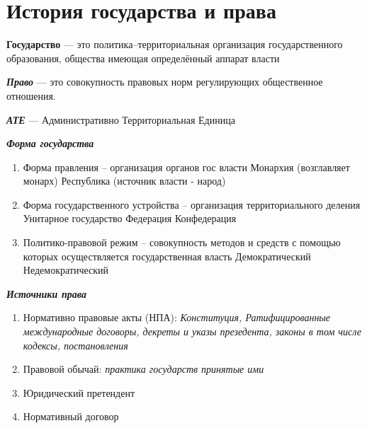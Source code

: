 \documentclass[14pt]{extarticle}
\begin{document}
	\section{История государства и права}
	\textbf{Государство} --- это политика--территориальная организация государственного образования, общества имеющая определённый аппарат власти
	
	\textbf{\textit{Право}} --- это совокупность правовых норм регулирующих общественное отношения.
	
	\textbf{\textit{АТЕ}} --- Административно Территориальная Единица
	
	\begin{center}
		\textbf{\textit{Форма государства}}
	\end{center}
	\begin{enumerate}
		\item Форма правления -- организация органов гос власти
			\subitem Монархия (возглавляет монарх)
			\subitem Республика (источник власти - народ)
		\item Форма государственного устройства -- организация территориального деления
			\subitem Унитарное государство
			\subitem Федерация 
			\subitem Конфедерация
		\item Политико-правовой режим -- совокупность методов и средств с помощью которых осуществляется государственная власть
			\subitem Демократический
			\subitem Недемократический
	\end{enumerate}  
	
	\newpage	
	\begin{center}
	\textbf{\textit{Источники права}}
	\end{center}
	\begin{enumerate}
		\item Нормативно правовые акты (НПА): \textit{Конституция, Ратифицированные международные договоры, декреты и указы презедента, законы в том числе кодексы, постановления}
		\item Правовой обычай: \textit{практика государств принятые ими}
		\item Юридический претендент
		\item Нормативный договор
	\end{enumerate}
	
	\newpage
\end{document}
